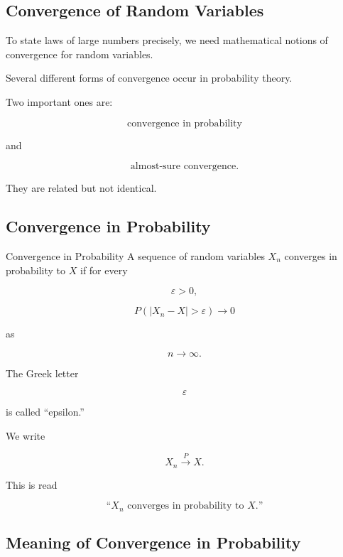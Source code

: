 \subsection{Convergence of Random Variables}
\label{subsec:convergence-random-variables}

To state laws of large numbers precisely, we need mathematical notions
of convergence for random variables.

Several different forms of convergence occur in probability theory.

Two important ones are:

\[
\boxed{
\text{convergence in probability}
}
\]

and

\[
\boxed{
\text{almost-sure convergence}.
}
\]

They are related but not identical.

\subsection{Convergence in Probability}
\label{subsec:convergence-in-probability}

\begin{definitionbox}{Convergence in Probability}
A sequence of random variables \(X_n\) converges in probability to
\(X\) if for every

\[
\varepsilon>0,
\]

\[
\boxed{
P(|X_n-X|>\varepsilon)
\to0
}
\]

as

\[
n\to\infty.
\]
\end{definitionbox}

The Greek letter

\[
\varepsilon
\]

is called ``epsilon.''

We write

\[
\boxed{
X_n
\xrightarrow{P}
X.
}
\]

This is read

\[
\text{``\(X_n\) converges in probability to \(X\).''}
\]

\subsection{Meaning of Convergence in Probability}
\label{subsec:meaning-convergence-probability}

